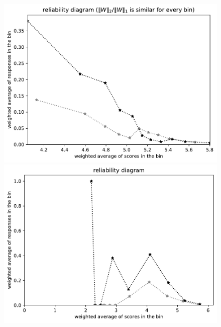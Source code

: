 \documentclass{article}
\newlength{\vertsep}
\newlength{\imsize}
\begin{document}
\begin{figure}
\begin{centering}
\parbox{\imsize}{\includegraphics[width=\imsize]
{../codes/weighted/County_of_San_Francisco_vs_Contra_Costa-LNGI/equierrs10.pdf}}
\quad\quad
\parbox{\imsize}{\includegraphics[width=\imsize]
{../codes/weighted/County_of_San_Francisco_vs_Contra_Costa-LNGI/equiscores10.pdf}}

\vspace{\vertsep}


\end{centering}
\end{figure}
\end{document}
